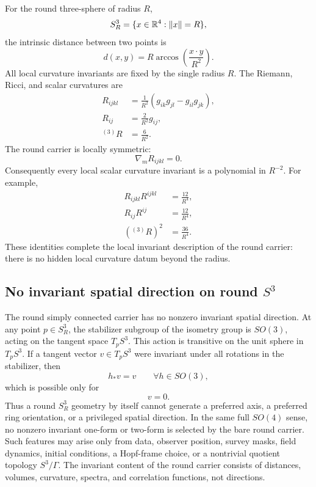 \documentclass[aps,prd,onecolumn,superscriptaddress,longbibliography,nofootinbib,notitlepage]{revtex4-2}
\begin{document}
For the round three-sphere of radius $R$,
\begin{equation}
  S^3_R=\{x\in\mathbb R^4:\norm{x}=R\},
\end{equation}
the intrinsic distance between two points is
\begin{equation}
  d(x,y)=R\arccos\!\left(\frac{x\cdot y}{R^2}\right).
\end{equation}
All local curvature invariants are fixed by the single radius $R$. The Riemann,
Ricci, and scalar curvatures are
\begin{align}
  R_{ijkl}
  &=\frac{1}{R^2}(g_{ik}g_{jl}-g_{il}g_{jk}), \\
  R_{ij}&=\frac{2}{R^2}g_{ij}, \\
  {}^{(3)}R&=\frac{6}{R^2}.
\end{align}
The round carrier is locally symmetric:
\begin{equation}
  \nabla_m R_{ijkl}=0.
\end{equation}
Consequently every local scalar curvature invariant is a polynomial in $R^{-2}$.
For example,
\begin{align}
  R_{ijkl}R^{ijkl}&=\frac{12}{R^4}, \\
  R_{ij}R^{ij}&=\frac{12}{R^4}, \\
  \left({}^{(3)}R\right)^2&=\frac{36}{R^4}.
\end{align}
These identities complete the local invariant description of the round carrier:
there is no hidden local curvature datum beyond the radius.

\subsection{No invariant spatial direction on round \texorpdfstring{$S^3$}{S3}}
\label{sec:no-invariant-direction}

The round simply connected carrier has no nonzero invariant spatial direction.
At any point $p\in S^3_R$, the stabilizer subgroup of the isometry group is
$SO(3)$, acting on the tangent space $T_pS^3$. This action is transitive on the
unit sphere in $T_pS^3$. If a tangent vector $v\in T_pS^3$ were invariant under
all rotations in the stabilizer, then
\begin{equation}
  h_\ast v=v\qquad \forall h\in SO(3),
\end{equation}
which is possible only for
\begin{equation}
  v=0.
\end{equation}
Thus a round $S^3_R$ geometry by itself cannot generate a preferred axis, a
preferred ring orientation, or a privileged spatial direction. In the same full
$SO(4)$ sense, no nonzero invariant one-form or two-form is selected by the bare
round carrier. Such features may arise only from data, observer position, survey
masks, field dynamics, initial conditions, a Hopf-frame choice, or a nontrivial
quotient topology $S^3/\Gamma$. The invariant content of the round carrier
consists of distances, volumes, curvature, spectra, and correlation functions,
not directions.
\end{document}
